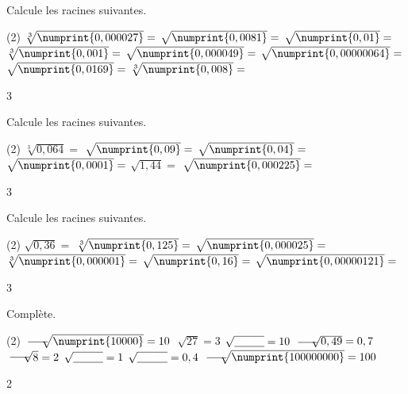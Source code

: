 \documentclass[a4paper,11pt]{report}
\begin{document}
\begin{exop}{ 
Calcule les racines suivantes.
\begin{tasks}(2)
    \task $\sqrt[3]{\numprint{0,000027}}=$
    \task $\sqrt{\numprint{0,0081}}=$
    \task $\sqrt{\numprint{0,01}}=$
    \task $\sqrt[3]{\numprint{0,001}}=$
    \task $\sqrt{\numprint{0,000049}}=$
    \task $\sqrt{\numprint{0,00000064}}=$
    \task $\sqrt{\numprint{0,0169}}=$
    \task $\sqrt[3]{\numprint{0,008}}=$
\end{tasks}
}{3}
\end{exop}


\begin{exop}{ 
Calcule les racines suivantes.
\begin{tasks}(2)
    \task $\sqrt[3]{0,064}=$
    \task $\sqrt{\numprint{0,09}}=$
    \task $\sqrt{\numprint{0,04}}=$
    \task $\sqrt{\numprint{0,0001}}=$
    \task $\sqrt{1,44}=$
    \task $\sqrt{\numprint{0,000225}}=$
    
\end{tasks}
}{3}
\end{exop}


\begin{exop}{ 
Calcule les racines suivantes.
\begin{tasks}(2)
    \task $\sqrt{0,36}=$
    \task $\sqrt[3]{\numprint{0,125}}=$
    \task $\sqrt{\numprint{0,000025}}=$
    \task $\sqrt[3]{\numprint{0,000001}}=$
    \task $\sqrt{\numprint{0,16}}=$
    \task $\sqrt{\numprint{0,00000121}}=$
\end{tasks}
}{3}
\end{exop}

\begin{exop}{
Complète.
\begin{tasks}(2)
    \task $\sqrt[\underline{{\color{white}XXX}}]{\numprint{10000}}=10$
    \task $\sqrt[\underline{~~~~}]{27}=3$
    \task $\sqrt{\underline{{\color{white}XXX}}}=10$
    \task $\sqrt[\underline{{\color{white}XXX}}]{0,49}=0,7$
    \task $\sqrt[\underline{{\color{white}XXX}}]{8}=2$
    \task $\sqrt{\underline{{\color{white}XXX}}}=1$
    \task $\sqrt{\underline{{\color{white}XXX}}}=0,4$
    \task $\sqrt[\underline{{\color{white}XXX}}]{\numprint{100000000}}=100$
\end{tasks}
}{2}    
\end{exop}
\end{document}
